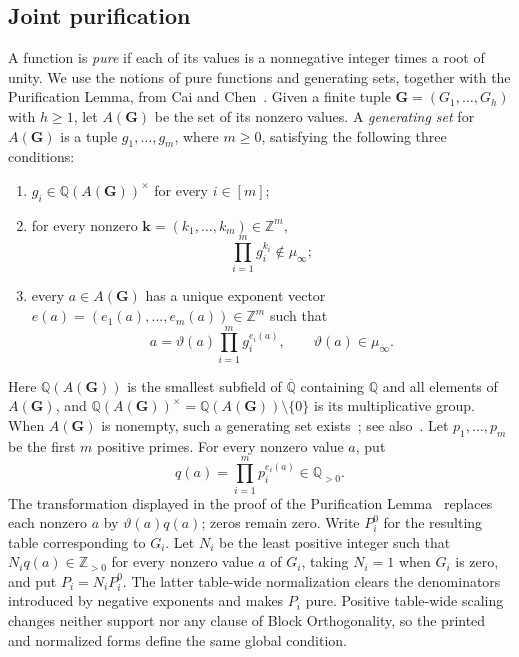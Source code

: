 \documentclass[11pt]{article}
\theoremstyle{plain}
\theoremstyle{definition}
\theoremstyle{remark}
\newcommand{\AlgNums}{\overline{\mathbb Q}}
\begin{document}
\subsection{Joint purification}

A function is
\emph{pure} if each of its values is a nonnegative integer times a root of
unity.  We use the notions of pure functions and generating sets, together
with the Purification Lemma, from Cai and
Chen~\cite[Definitions~2--3 and Lemma~7]{CaiChen2017}.  Given a finite tuple
$\mathbf G=(G_1,\ldots,G_h)$ with $h\ge1$, let $A(\mathbf G)$ be the set of
its nonzero values.  A \emph{generating set} for $A(\mathbf G)$ is a tuple
$g_1,\ldots,g_m$, where $m\ge0$, satisfying the following three conditions:
\begin{enumerate}
  \item $g_i\in\mathbb Q(A(\mathbf G))^\times$ for every $i\in[m]$;
  \item for every nonzero
        $\mathbf k=(k_1,\ldots,k_m)\in\mathbb Z^m$,
        \[
          \prod_{i=1}^m g_i^{k_i}\notin\mu_\infty;
        \]
  \item every $a\in A(\mathbf G)$ has a unique exponent vector
        $e(a)=(e_1(a),\ldots,e_m(a))\in\mathbb Z^m$ such that
\begin{equation}
  a=\vartheta(a)\prod_{i=1}^m g_i^{e_i(a)},
  \qquad \vartheta(a)\in\mu_\infty.
  \label{eq:multiplicative-decomposition}
\end{equation}
\end{enumerate}
Here $\mathbb Q(A(\mathbf G))$ is the smallest subfield of $\AlgNums$
containing $\mathbb Q$ and all elements of $A(\mathbf G)$, and
$\mathbb Q(A(\mathbf G))^\times
=\mathbb Q(A(\mathbf G))\setminus\{0\}$ is its multiplicative group.
When $A(\mathbf G)$ is nonempty, such a generating set
exists~\cite[Lemma~7.2]{CaiChenLu2013}; see
also~\cite[Lemma~8]{CaiChen2017}.  Let $p_1,\ldots,p_m$ be the first $m$
positive primes.
For every nonzero value $a$, put
\[
  q(a)=\prod_{i=1}^m p_i^{e_i(a)}\in\mathbb Q_{>0}.
\]
The transformation displayed in the proof of the Purification
Lemma~\cite[Lemma~7]{CaiChen2017} replaces each nonzero $a$ by
$\vartheta(a)q(a)$; zeros remain zero.  Write $P_i^0$ for the resulting table
corresponding to $G_i$.
Let $N_i$ be the least positive integer such that
$N_iq(a)\in\mathbb Z_{>0}$ for every nonzero value $a$ of $G_i$, taking
$N_i=1$ when $G_i$ is zero, and put $P_i=N_iP_i^0$.  The latter table-wide
normalization clears the denominators introduced by negative exponents and
makes $P_i$ pure.  Positive table-wide scaling
changes neither support nor any clause of Block Orthogonality, so the printed
and normalized forms define the same global condition.
\end{document}
